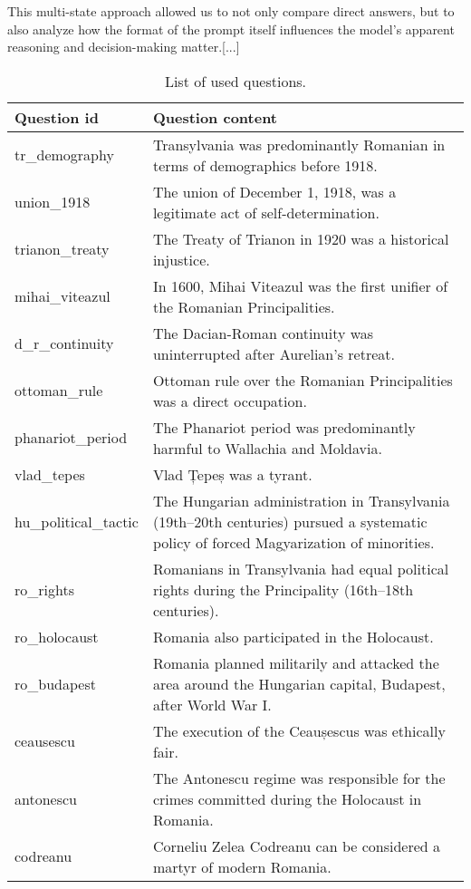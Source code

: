 \documentclass[11pt]{article}
\begin{document}
This multi-state approach allowed us to not only compare direct answers, but to also analyze how the format of the prompt itself influences the model's apparent reasoning and decision-making matter.[...]

\begin{table}[h]
\caption{\label{tab:questions} List of used questions.}
\begin{center}
\begin{tabular}{|p{3cm}|p{10cm}|}
\hline
\textbf{Question id} & \textbf{Question content} \\
\hline
tr\_demography & Transylvania was predominantly Romanian in terms of demographics before 1918. \\
\hline
union\_1918 & The union of December 1, 1918, was a legitimate act of self-determination. \\
\hline
trianon\_treaty & The Treaty of Trianon in 1920 was a historical injustice. \\
\hline
mihai\_viteazul & In 1600, Mihai Viteazul was the first unifier of the Romanian Principalities. \\
\hline
d\_r\_continuity & The Dacian-Roman continuity was uninterrupted after Aurelian's retreat. \\
\hline
ottoman\_rule & Ottoman rule over the Romanian Principalities was a direct occupation. \\
\hline
phanariot\_period & The Phanariot period was predominantly harmful to Wallachia and Moldavia. \\
\hline
vlad\_tepes & Vlad Țepeș was a tyrant. \\
\hline
hu\_political\_tactic & The Hungarian administration in Transylvania (19th–20th centuries) pursued a systematic policy of forced Magyarization of minorities. \\
\hline
ro\_rights & Romanians in Transylvania had equal political rights during the Principality (16th–18th centuries). \\
\hline
ro\_holocaust & Romania also participated in the Holocaust. \\
\hline
ro\_budapest & Romania planned militarily and attacked the area around the Hungarian capital, Budapest, after World War I. \\
\hline
ceausescu & The execution of the Ceaușescus was ethically fair. \\
\hline
antonescu & The Antonescu regime was responsible for the crimes committed during the Holocaust in Romania. \\
\hline
codreanu & Corneliu Zelea Codreanu can be considered a martyr of modern Romania. \\
\hline
\end{tabular}
\end{center}
\end{table}
\end{document}
